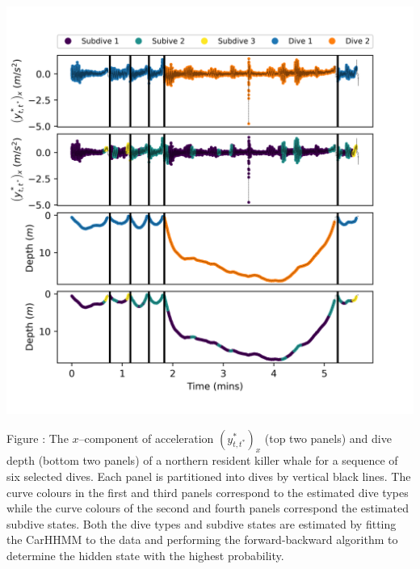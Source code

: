 \documentclass{article}
\begin{document}
        \begin{center}
        \includegraphics[width=6in]{../Plots/2019/20190902-182840-CATs_OB_1_0_267_CarHHMM1_decoded_dives.png}
        \end{center}
        
        \noindent Figure : The $x$--component of acceleration $\left(y^*_{t,t^*}\right)_x$ (top two panels) and dive depth (bottom two panels) of a northern resident killer whale for a sequence of six selected dives. Each panel is partitioned into dives by vertical black lines. The curve colours in the first and third panels correspond to the estimated dive types while the curve colours of the second and fourth panels correspond the estimated subdive states. Both the dive types and subdive states are estimated by fitting the CarHHMM to the data and performing the forward-backward algorithm to determine the hidden state with the highest probability.
        \addtocounter{fignum}{1}
        
\end{document}
